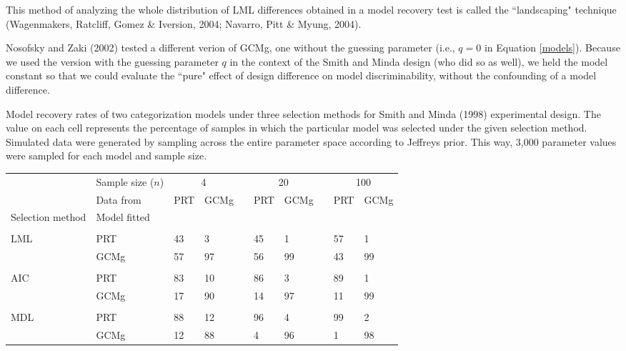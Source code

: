 \documentclass[11pt]{article}
\renewcommand{\baselinestretch}{1}
\begin{document}
\footnotemark[7] This method of analyzing the whole distribution of LML differences obtained in a
model recovery test is called the ``landscaping" technique (Wagenmakers, Ratcliff, Gomez \&
Iversion, 2004; Navarro, Pitt \& Myung, 2004).

\footnotemark[8] Nosofsky and Zaki (2002) tested a different verion of GCMg, one without the
guessing parameter (i.e., $q = 0$ in Equation \ref{models}). Because we used the version with the
guessing parameter $q$ in the context of the Smith and Minda design (who did so as well), we held
the model constant so that we could evaluate the ``pure" effect of design difference on model
discriminability, without the confounding of a model difference.

\clearpage
\renewcommand{\baselinestretch}{1}
\normalsize


 Model recovery rates of two categorization models under three selection
methods for Smith and Minda (1998) experimental design. The value on each cell represents the
percentage of samples in which the particular model was selected under the given selection method.
Simulated data were generated by sampling across the entire parameter space according to Jeffreys
prior. This way, 3,000 parameter values were sampled for each model and sample size. \vskip
0.150in
\begin{center}
\begin{tabular}{llllllllll}
\hline & \multicolumn{1}{l}{Sample size ($n$)} & \multicolumn{2}{c}{4} & & \multicolumn{2}{c}{20}
& & \multicolumn{2}{c}{100} \\ \cline{3-4} \cline{6-7} \cline{9-10} &
\multicolumn{1}{l}{Data  from}  & PRT & GCMg & & PRT & GCMg & & PRT & GCMg  \\
\hline Selection method & Model fitted \\\\
LML & PRT & 43 & 3 & & 45 & 1 & & 57 & 1 \\
& GCMg & 57 & 97 & & 56 & 99 & & 43 & 99 \\ \\
AIC & PRT & 83 & 10 & & 86 & 3 & &  89 & 1 \\
& GCMg & 17 & 90 & & 14 & 97 &  &11 & 99 \\\\
MDL & PRT & 88 & 12 & &  96 & 4 & & 99 & 2 \\
& GCMg & 12 & 88 & & 4 & 96 & & 1 & 98 \\ \hline
\end{tabular}
\end{center}
\end{document}
